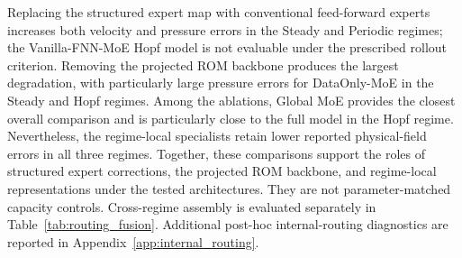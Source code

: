 Replacing the structured expert map with conventional feed-forward experts increases both velocity and pressure errors in the Steady and Periodic regimes; the Vanilla-FNN-MoE Hopf model is not evaluable under the prescribed rollout criterion. Removing the projected ROM backbone produces the largest degradation, with particularly large pressure errors for DataOnly-MoE in the Steady and Hopf regimes. Among the ablations, Global MoE provides the closest overall comparison and is particularly close to the full model in the Hopf regime. Nevertheless, the regime-local specialists retain lower reported physical-field errors in all three regimes. Together, these comparisons support the roles of structured expert corrections, the projected ROM backbone, and regime-local representations under the tested architectures. They are not parameter-matched capacity controls. Cross-regime assembly is evaluated separately in Table~\ref{tab:routing_fusion}. Additional post-hoc internal-routing diagnostics are reported in
Appendix~\ref{app:internal_routing}.







